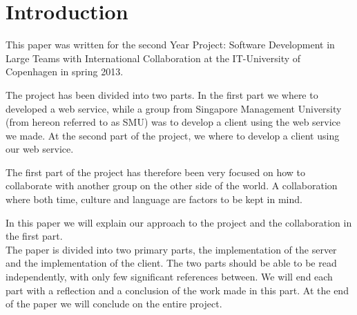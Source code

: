 \section{Introduction}
This paper was written for the second Year Project: Software Development in Large Teams with International Collaboration at the IT-University of Copenhagen in spring 2013.

The project has been divided into two parts. In the first part we where to developed a web service, while a group from Singapore Management University (from hereon referred to as SMU) was to develop a client using the web service we made. At the second part of the project, we where to develop a client using our web service.

The first part of the project has therefore been very focused on how to collaborate with another group on the other side of the world. A collaboration where both time, culture and language are factors to be kept in mind.

In this paper we will explain our approach to the project and the collaboration in the first part.\\
The paper is divided into two primary parts, the implementation of the server and the implementation of the client.
The two parts should be able to be read independently, with only few significant references between. We will end each part with a reflection and a conclusion of the work made in this part.
At the end of the paper we will conclude on the entire project.
\newpage